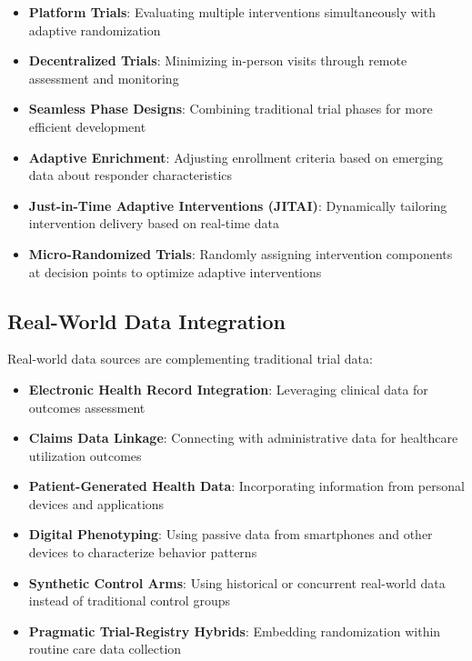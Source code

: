 \begin{itemize}
    \item \textbf{Platform Trials}: Evaluating multiple interventions simultaneously with adaptive randomization
    
    \item \textbf{Decentralized Trials}: Minimizing in-person visits through remote assessment and monitoring
    
    \item \textbf{Seamless Phase Designs}: Combining traditional trial phases for more efficient development
    
    \item \textbf{Adaptive Enrichment}: Adjusting enrollment criteria based on emerging data about responder characteristics
    
    \item \textbf{Just-in-Time Adaptive Interventions (JITAI)}: Dynamically tailoring intervention delivery based on real-time data
    
    \item \textbf{Micro-Randomized Trials}: Randomly assigning intervention components at decision points to optimize adaptive interventions
\end{itemize}

\subsection{Real-World Data Integration}
Real-world data sources are complementing traditional trial data:

\begin{itemize}
    \item \textbf{Electronic Health Record Integration}: Leveraging clinical data for outcomes assessment
    
    \item \textbf{Claims Data Linkage}: Connecting with administrative data for healthcare utilization outcomes
    
    \item \textbf{Patient-Generated Health Data}: Incorporating information from personal devices and applications
    
    \item \textbf{Digital Phenotyping}: Using passive data from smartphones and other devices to characterize behavior patterns
    
    \item \textbf{Synthetic Control Arms}: Using historical or concurrent real-world data instead of traditional control groups
    
    \item \textbf{Pragmatic Trial-Registry Hybrids}: Embedding randomization within routine care data collection
\end{itemize}

